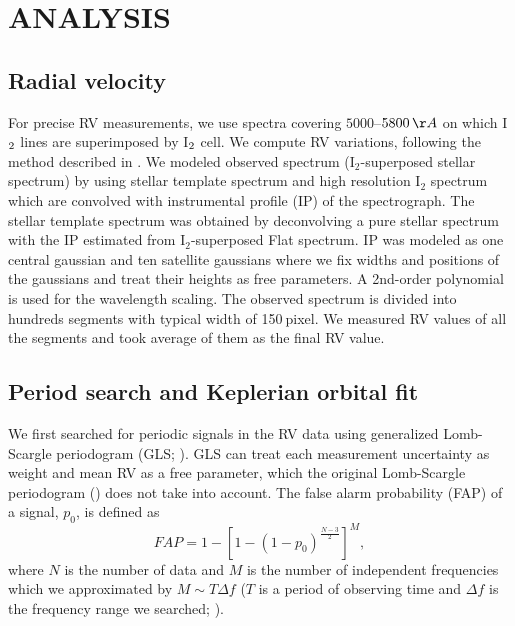 \documentclass[]{pasj01}
\begin{document}
\section{ANALYSIS}
\subsection{Radial velocity}
\label{sec:rv}
For precise RV measurements, we use spectra covering $5000$--$5800\,{\rm \AA}$ on which I$_{\rm 2}$ lines are superimposed by I$_{\rm 2}$ cell.
We compute RV variations, following the method described in \citet{Sato2002}.
We modeled observed spectrum (I$_2$-superposed stellar spectrum) by using stellar template spectrum and high resolution I$_2$ spectrum which are convolved with instrumental profile (IP) of the spectrograph.
The stellar template spectrum was obtained by deconvolving a pure stellar spectrum with the IP estimated from I$_2$-superposed Flat spectrum.
IP was modeled as one central gaussian and ten satellite gaussians where we fix widths and positions of the gaussians and treat their heights as free parameters.
A 2nd-order polynomial is used for the wavelength scaling.
The observed spectrum is divided into hundreds segments with typical width of 150$\>$pixel.
We measured RV values of all the segments and took average of them as the final RV value. 
\subsection{Period search and Keplerian orbital fit}
We first searched for periodic signals in the RV data using generalized Lomb-Scargle periodogram (GLS; \cite{Zechmeister2009}).
GLS can treat each measurement uncertainty as weight and mean RV as a free parameter, which the original Lomb-Scargle periodogram (\cite{Scargle1982}) does not take into account.
The false alarm probability (FAP) of a signal, $p_0$, is defined as
\begin{equation}
FAP=1-\left[1-(1-p_0)^{\frac{N-3}{2}}\right]^M,
\end{equation}
where $N$ is the number of data and $M$ is the number of independent frequencies which we approximated by $M\sim T\Delta f$ ($T$ is a period of observing time and $\Delta f$ is the frequency range we searched; \cite{Cumming2004}).
\end{document}
